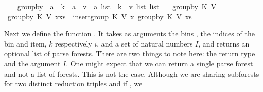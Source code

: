\begin{isabellebody}
\ \ {\isacharparenright}{\kern0pt}{\isachardoublequoteclose}\isanewline
\isanewline
{}\isamarkupfalse%
\ group{\isacharunderscore}{\kern0pt}by\ {\isacharcolon}{\kern0pt}{\isacharcolon}{\kern0pt}\ {\isachardoublequoteopen}{\isacharparenleft}{\kern0pt}{\isacharprime}{\kern0pt}a\ {\isasymRightarrow}\ {\isacharprime}{\kern0pt}k{\isacharparenright}{\kern0pt}\ {\isasymRightarrow}\ {\isacharparenleft}{\kern0pt}{\isacharprime}{\kern0pt}a\ {\isasymRightarrow}\ {\isacharprime}{\kern0pt}v{\isacharparenright}{\kern0pt}\ {\isasymRightarrow}\ {\isacharprime}{\kern0pt}a\ list\ {\isasymRightarrow}\ {\isacharparenleft}{\kern0pt}{\isacharprime}{\kern0pt}k\ {\isasymtimes}\ {\isacharprime}{\kern0pt}v\ list{\isacharparenright}{\kern0pt}\ list{\isachardoublequoteclose}\ \isanewline
\ \ {\isachardoublequoteopen}group{\isacharunderscore}{\kern0pt}by\ K\ V\ {\isacharbrackleft}{\kern0pt}{\isacharbrackright}{\kern0pt}\ {\isacharequal}{\kern0pt}\ {\isacharbrackleft}{\kern0pt}{\isacharbrackright}{\kern0pt}{\isachardoublequoteclose}\isanewline
{\isacharbar}{\kern0pt}\ {\isachardoublequoteopen}group{\isacharunderscore}{\kern0pt}by\ K\ V\ {\isacharparenleft}{\kern0pt}x{\isacharhash}{\kern0pt}xs{\isacharparenright}{\kern0pt}\ {\isacharequal}{\kern0pt}\ insert{\isacharunderscore}{\kern0pt}group\ K\ V\ x\ {\isacharparenleft}{\kern0pt}group{\isacharunderscore}{\kern0pt}by\ K\ V\ xs{\isacharparenright}{\kern0pt}{\isachardoublequoteclose}\isanewline
%
\isadelimproof
%
\endisadelimproof
%
\isatagproof
%
\endisatagproof
{\isafoldproof}%
%
\isadelimproof
%
\endisadelimproof
%
\begin{isamarkuptext}%
Next we define the function . It takes as arguments the bins , the indices of the bin and
item, $k$ respectively $i$, and a set of natural numbers $I$, and returns an optional list of parse forests.
There are two things to note here: the return type and the argument $I$. One might expect that we can return
a single parse forest and not a list of forests. This is not the case. Although we are sharing subforests for two distinct reduction triples
 and  if , we

\end{isamarkuptext}
\end{isabellebody}
